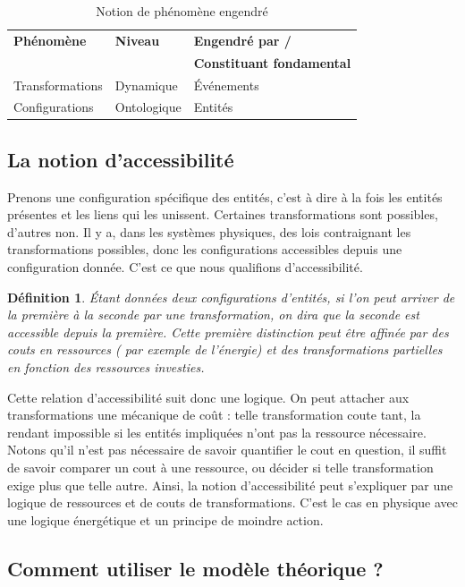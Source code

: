 \documentclass[11pt]{article}
\newtheorem{definition}{Définition}[section]
\begin{document}
	\begin{table}[H]
		\centering
		\begin{tabular}{|l|l|l|}
			\hline 
			\textbf{Phénomène} & \textbf{Niveau} & \textbf{Engendré par /} \\
			 & & \textbf{Constituant fondamental} \\
			\hline 
			Transformations & Dynamique & Événements \\
			\hline 
			Configurations & Ontologique & Entités \\
			\hline 
		\end{tabular}
		\caption{Notion de phénomène engendré}
	\end{table}
	
	
	\subsection*{La notion d'accessibilité}
	
	Prenons une configuration spécifique des entités, c'est à dire à la fois les entités présentes et les liens qui les unissent. Certaines transformations sont possibles, d'autres non. Il y a, dans les systèmes physiques, des lois contraignant les transformations possibles, donc les configurations accessibles depuis une configuration donnée. C'est ce que nous qualifions d'accessibilité. 
	
	\begin{definition}
		Étant données deux configurations d'entités, si l'on peut arriver de la première à la seconde par une transformation, on dira que la seconde est accessible depuis la première. Cette première distinction peut être affinée par des couts en ressources ( par exemple de l'énergie) et des transformations partielles en fonction des ressources investies. 
	\end{definition}
	
	Cette relation d'accessibilité suit donc une logique. On peut attacher aux transformations une mécanique de coût : telle transformation coute tant, la rendant impossible si les entités impliquées n'ont pas la ressource nécessaire. Notons qu'il n'est pas nécessaire de savoir quantifier le cout en question, il suffit de savoir comparer un cout à une ressource, ou décider si telle transformation exige plus que telle autre. Ainsi, la notion d'accessibilité peut s'expliquer par une logique de ressources et de couts de transformations. C'est le cas en physique avec une logique énergétique et un principe de moindre action. 
	
	
	\subsection*{Comment utiliser le modèle théorique ?}
	
\end{document}
